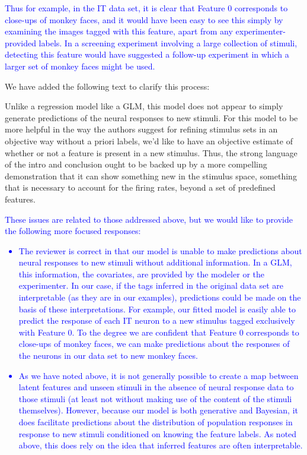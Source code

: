 \documentclass[12pt,a4paper]{article}
\newcommand{\edit}[1]{\textcolor{blue}{#1}}
\begin{document}
\edit{
Thus for example, in the IT data set, it is clear that Feature 0 corresponds to close-ups of monkey faces, and it would have been easy to see this simply by examining the images tagged with this feature, apart from any experimenter-provided labels. In a screening experiment involving a large collection of stimuli, detecting this feature would have suggested a follow-up experiment in which a larger set of monkey faces might be used.
}

{\color{red} We have added the following text to clarify this process:}

Unlike a regression model like a GLM, this model does not appear to simply generate predictions of the neural responses to new stimuli. For this model to be more helpful in the way the authors suggest for refining stimulus sets in an objective way without a priori labels, we’d like to have an objective estimate of whether or not a feature is present in a new stimulus. Thus, the strong language of the intro and conclusion ought to be backed up by a more compelling demonstration that it can show something new in the stimulus space, something that is necessary to account for the firing rates, beyond a set of predefined features.

\edit{
These issues are related to those addressed above, but we would like to provide the following more focused responses:
\begin{itemize}
    \item The reviewer is correct in that our model is unable to make predictions about neural responses to new stimuli without additional information. In a GLM, this information, the covariates, are provided by the modeler or the experimenter. In our case, if the tags inferred in the original data set are interpretable (as they are in our examples), predictions could be made on the basis of these interpretations. For example, our fitted model is easily able to predict the response of each IT neuron to a new stimulus tagged exclusively with Feature 0. To the degree we are confident that Feature 0 corresponds to close-ups of monkey faces, we can make predictions about the responses of the neurons in our data set to new monkey faces.
    \item As we have noted above, it is not generally possible to create a map between latent features and unseen stimuli in the absence of neural response data to those stimuli (at least not without making use of the content of the stimuli themselves). However, because our model is both generative and Bayesian, it does facilitate predictions about the distribution of population responses in response to new stimuli conditioned on knowing the feature labels. As noted above, this does rely on the idea that inferred features are often interpretable.
\end{itemize}
}
\end{document}
